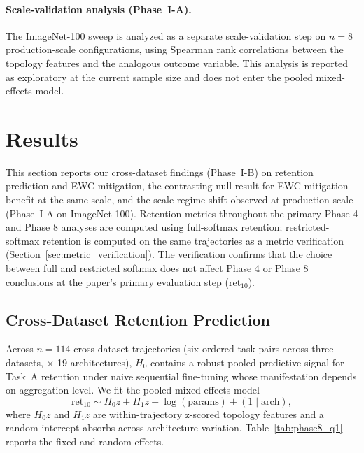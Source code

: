 \documentclass[10pt,twocolumn]{article}
\begin{document}
\paragraph{Scale-validation analysis (Phase~I-A).}
The ImageNet-100 sweep is analyzed as a separate scale-validation step on $n = 8$ production-scale configurations, using Spearman rank correlations between the topology features and the analogous outcome variable. This analysis is reported as exploratory at the current sample size and does not enter the pooled mixed-effects model.

\section{Results}
\label{sec:results}

This section reports our cross-dataset findings (Phase~I-B) on retention prediction and EWC mitigation, the contrasting null result for EWC mitigation benefit at the same scale, and the scale-regime shift observed at production scale (Phase~I-A on ImageNet-100). Retention metrics throughout the primary Phase 4 and Phase 8 analyses are computed using full-softmax retention; restricted-softmax retention is computed on the same trajectories as a metric verification (Section~\ref{sec:metric_verification}). The verification confirms that the choice between full and restricted softmax does not affect Phase 4 or Phase 8 conclusions at the paper's primary evaluation step (ret$_{10}$).

\subsection{Cross-Dataset Retention Prediction}
\label{sec:results_q1}

Across $n = 114$ cross-dataset trajectories (six ordered task pairs across three datasets, $\times$ 19 architectures), $H_0$ contains a robust pooled predictive signal for Task~A retention under naive sequential fine-tuning whose manifestation depends on aggregation level. We fit the pooled mixed-effects model
\begin{equation*}
\text{ret}_{10} \sim H_0 z + H_1 z + \log(\text{params}) + (1 \mid \text{arch}),
\end{equation*}
where $H_0 z$ and $H_1 z$ are within-trajectory z-scored topology features and a random intercept absorbs across-architecture variation. Table~\ref{tab:phase8_q1} reports the fixed and random effects.
\end{document}
